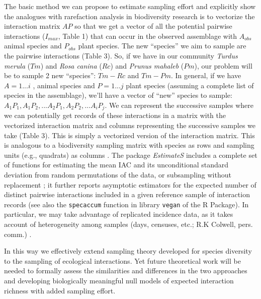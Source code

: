 \documentclass[12pt]{article}
\begin{document}
The basic method we can propose to estimate sampling effort and explicitly show the analogues with rarefaction analysis in biodiversity research is to vectorize the interaction matrix $AP$ so that we get a vector of all the potential pairwise interactions ($I_{max}$, Table 1) that can occur in the observed assemblage with $A_{obs}$ animal species and $P_{obs}$ plant species. The new ``species'' we aim to sample are the pairwise interactions (Table 3). So, if we have in our community \emph{Turdus merula} ($Tm$) and \emph{Rosa canina} ($Rc$) and \emph{Prunus mahaleb} ($Pm$), our problem will be to sample 2 new ``species'': $Tm-Rc$ and $Tm-Pm$. In general, if we have $A= 1... i$ , animal species and $P = 1... j$ plant species (assuming a complete list of species in the assemblage), we'll have a vector of ``new'' species to sample: $A_1P_1, A_1P_2,... A_2P_1, A_2P_2, ... A_iP_j$. We can represent the successive samples where we can potentially get records of these interactions in a matrix with the vectorized interaction matrix and columns representing the successive samples we take (Table 3). This is simply a vectorized version of the interaction matrix. This is analogous to a biodiversity sampling matrix with species as rows and sampling units (e.g., quadrats) as columns \citep{Jordano:2009c}. The package \emph{EstimateS} \citep{Colwell:2013kj} includes a complete set of functions for estimating the mean IAC and its unconditional standard deviation from random permutations of the data, or subsampling without replacement \citep{Gotelli:2001uo}; it further reports asymptotic estimators for the expected number of distinct pairwise interactions included in a given reference sample of interaction records (see also the \texttt{specaccum} function in library \texttt{vegan} of the R Package)\citep{RCoreTeam:2010,Jordano:2009c,Olesen:2011a}. In particular, we may take advantage of replicated incidence data, as it takes account of heterogeneity among samples (days, censuses, etc.; R.K Colwell, pers. comm.) \citep[see also ][]{Colwell:2004fi,Colwell:2012fc,Chao:2014wm}.

In this way we effectively extend sampling theory developed for species diversity to the sampling of ecological interactions. Yet future theoretical work will be needed to formally assess the similarities and differences in the two approaches and developing biologically meaningful null models of expected interaction richness with added sampling effort.

\end{document}
